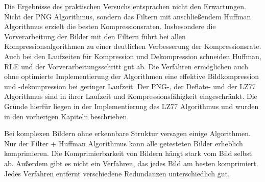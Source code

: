 \documentclass[conference]{IEEEtran}
\begin{document}
Die Ergebnisse des praktischen Versuchs entsprachen nicht den Erwartungen.
Nicht der PNG Algorithmus, sondern das Filtern mit anschließendem
Huffman Algorithmus erzielt die besten Kompressionsraten.
Insbesondere die Vorverarbeitung der Bilder mit den Filtern führt
bei allen Kompressionsalgorithmen zu einer deutlichen Verbesserung
der Kompressionsrate.
Auch bei den Laufzeiten für Kompression und Dekompression schneiden
Huffman, RLE und der Vorverarbeitungsschritt gut ab.
Die Verfahren ermöglichen auch ohne optimierte Implementierung der
Algorithmen eine effektive Bildkompression und -dekompression bei
geringer Laufzeit.
Der PNG-, der Deflate- und der LZ77 Algorithmus sind in ihrer Laufzeit und
Kompressionsfähigkeit eingeschränkt.
Die Gründe hierfür liegen in der Implementierung des LZ77 Algorithmus und
wurden in den vorherigen Kapiteln beschrieben.

Bei komplexen Bildern ohne erkennbare Struktur versagen einige Algorithmen.
Nur der Filter + Huffman Algorithmus kann alle getesteten Bilder erheblich
komprimieren.
Die Komprimierbarkeit von Bildern hängt stark vom Bild selbst ab.
Außerdem gibt es nicht ein Verfahren, das jedes Bild am besten komprimiert.
Jedes Verfahren entfernt verschiedene Redundanzen unterschiedlich gut.



\end{document}
